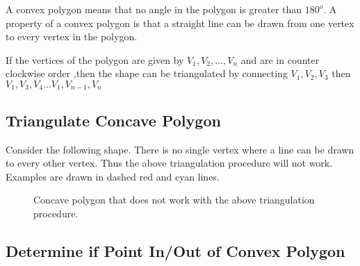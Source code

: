 \documentclass[a4paper,10pt]{scrartcl}
\begin{document}
A convex polygon means that no angle in the polygon is greater than $180 ^o$. A property of a convex polygon is that
a straight line can be drawn from one vertex to every vertex in the polygon.

If the vertices of the polygon are given by $V_1, V_2, \dots, V_n$ and are in counter clockwise order
,then the shape can be triangulated by connecting $V_1, V_2, V_3$ then $V_1, V_3, V_4 \dots V_1, V_{n-1}, V_{n}$

\subsection{Triangulate Concave Polygon}

Consider the following shape. There is no single vertex where a line can be drawn to every other vertex.
Thus the above triangulation procedure will not work. Examples are drawn in dashed red and cyan lines.

\begin{figure}[!h]
 \centering

 \caption{Concave polygon that does not work with the above triangulation procedure.}
 
\end{figure}

\newpage
\subsection{Determine if Point In/Out of Convex Polygon}
\end{document}
